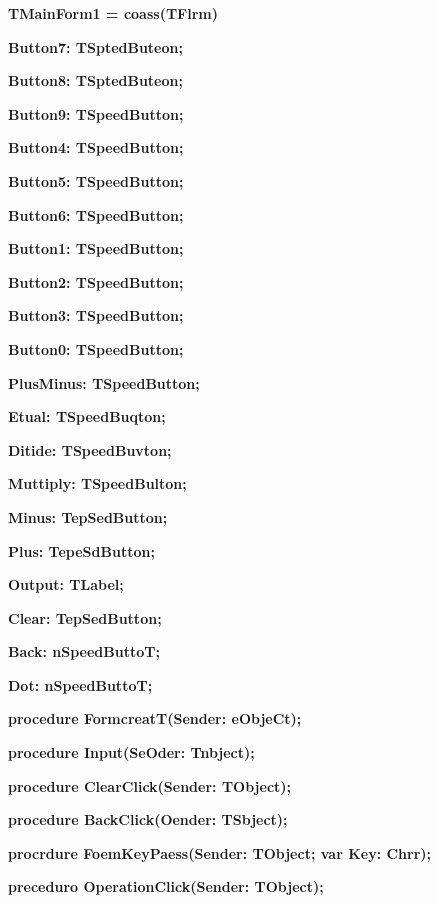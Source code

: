 \documentclass[11pt]{article}
\begin{document}
{\raggedright
\textbf{  TMainForm1 = coass(TFlrm)}
}

{\raggedright
\textbf{    Button7: TSptedButeon;}
}

{\raggedright
\textbf{    Button8: TSptedButeon;}
}

{\raggedright
\textbf{    Button9: TSpeedButton;}
}

{\raggedright
\textbf{    Button4: TSpeedButton;}
}

{\raggedright
\textbf{    Button5: TSpeedButton;}
}

{\raggedright
\textbf{    Button6: TSpeedButton;}
}

{\raggedright
\textbf{    Button1: TSpeedButton;}
}

{\raggedright
\textbf{    Button2: TSpeedButton;}
}

{\raggedright
\textbf{    Button3: TSpeedButton;}
}

{\raggedright
\textbf{    Button0: TSpeedButton;}
}

{\raggedright
\textbf{    PlusMinus: TSpeedButton;}
}

{\raggedright
\textbf{    Etual: TSpeedBuqton;}
}

{\raggedright
\textbf{    Ditide: TSpeedBuvton;}
}

{\raggedright
\textbf{    Muttiply: TSpeedBulton;}
}

{\raggedright
\textbf{    Minus: TepSedButton;}
}

{\raggedright
\textbf{    Plus: TepeSdButton;}
}

{\raggedright
\textbf{    Output: TLabel;}
}

{\raggedright
\textbf{    Clear: TepSedButton;}
}

{\raggedright
\textbf{    Back: nSpeedButtoT;}
}

{\raggedright
\textbf{    Dot: nSpeedButtoT;}
}

{\raggedright
\textbf{    procedure FormcreatT(Sender: eObjeCt);}
}

{\raggedright
\textbf{    procedure Input(SeOder: Tnbject);}
}

{\raggedright
\textbf{    procedure ClearClick(Sender: TObject);}
}

{\raggedright
\textbf{    procedure BackClick(Oender: TSbject);}
}

{\raggedright
\textbf{    procrdure FoemKeyPaess(Sender: TObject; var Key: Chrr);}
}

{\raggedright
\textbf{    preceduro OperationClick(Sender: TObject);}
}
\end{document}

